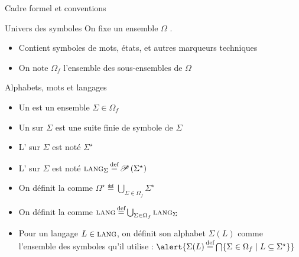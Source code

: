 
\begingroup

\begin{frame}{Cadre formel et conventions\footnotemark[1]}

  \vspace{-2mm}
  \begin{block}{Univers des symboles}
    On fixe un ensemble \alert{$\Omega$} .
    \begin{itemize}
    \item Contient symboles de mots, états, et autres marqueurs techniques
    \item On note \alert{$\Omega_f$} l'ensemble des sous-ensembles  de $\Omega$
    \end{itemize}
  \end{block}

  \vspace{-1mm}
  \begin{block}{Alphabets, mots et langages}
    \begin{itemize}
    \item Un  est un ensemble \alert{$\Sigma \in \Omega_f$}
    \item Un  sur $\Sigma$ est une suite finie de symbole de $\Sigma$
    \item L' sur $\Sigma$ est noté \alert{$\Sigma^\star$}
    \item L' sur $\Sigma$ est noté \alert{$\textsc{lang}_\Sigma \operatorname{\stackrel{\text{def}}{=}} \mathscr{P}\left(\Sigma^\star\right)$}
    \item On définit la  comme \alert{$\Omega^\star \eqdef \bigcup_{\Sigma \in \Omega_f} \Sigma^\star$}
    \item On définit la  comme \alert{$\textsc{lang} \operatorname{\stackrel{\text{def}}{=}} \bigcup_{\Sigma \in \Omega_f} \textsc{lang}_\Sigma$}
    \item Pour un langage $L\in \textsc{lang}$, on définit son alphabet \alert{$\Sigma(L)$} comme l'ensemble des symboles qu'il utilise :
      $\alert{\Sigma(L) \eqdef \bigcap \{\Sigma \in \Omega_f \mid L\subseteq \Sigma^\star\}}$
    \end{itemize}
  \end{block}

  
\end{frame}

\endgroup
\endinput
